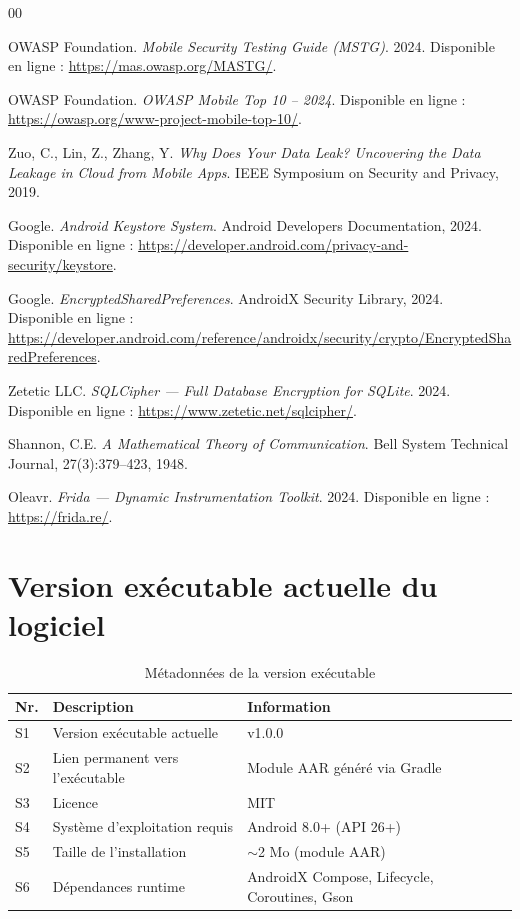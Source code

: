 \documentclass[preprint,12pt, a4paper]{elsarticle}
\begin{document}
\begin{thebibliography}{00}

OWASP Foundation. \textit{Mobile Security Testing Guide (MSTG)}. 2024. Disponible en ligne : \url{https://mas.owasp.org/MASTG/}.

OWASP Foundation. \textit{OWASP Mobile Top 10 – 2024}. Disponible en ligne : \url{https://owasp.org/www-project-mobile-top-10/}.

Zuo, C., Lin, Z., Zhang, Y. \textit{Why Does Your Data Leak? Uncovering the Data Leakage in Cloud from Mobile Apps}. IEEE Symposium on Security and Privacy, 2019.

Google. \textit{Android Keystore System}. Android Developers Documentation, 2024. Disponible en ligne : \url{https://developer.android.com/privacy-and-security/keystore}.

Google. \textit{EncryptedSharedPreferences}. AndroidX Security Library, 2024. Disponible en ligne : \url{https://developer.android.com/reference/androidx/security/crypto/EncryptedSharedPreferences}.

Zetetic LLC. \textit{SQLCipher — Full Database Encryption for SQLite}. 2024. Disponible en ligne : \url{https://www.zetetic.net/sqlcipher/}.

Shannon, C.E. \textit{A Mathematical Theory of Communication}. Bell System Technical Journal, 27(3):379--423, 1948.

Oleavr. \textit{Frida — Dynamic Instrumentation Toolkit}. 2024. Disponible en ligne : \url{https://frida.re/}.

\end{thebibliography}


\section*{Version exécutable actuelle du logiciel}
\label{}

\begin{table}[!h]
\begin{tabular}{|l|p{6.5cm}|p{6.5cm}|}
\hline
\textbf{Nr.} & \textbf{Description} & \textbf{Information} \\
\hline
S1 & Version exécutable actuelle & v1.0.0 \\
\hline
S2 & Lien permanent vers l'exécutable & Module AAR généré via Gradle \\
\hline
S3 & Licence & MIT \\
\hline
S4 & Système d'exploitation requis & Android 8.0+ (API 26+) \\
\hline
S5 & Taille de l'installation & $\sim$2 Mo (module AAR) \\
\hline
S6 & Dépendances runtime & AndroidX Compose, Lifecycle, Coroutines, Gson \\
\hline
\end{tabular}
\caption{Métadonnées de la version exécutable}
\label{tab:executable}
\end{table}
\end{document}
